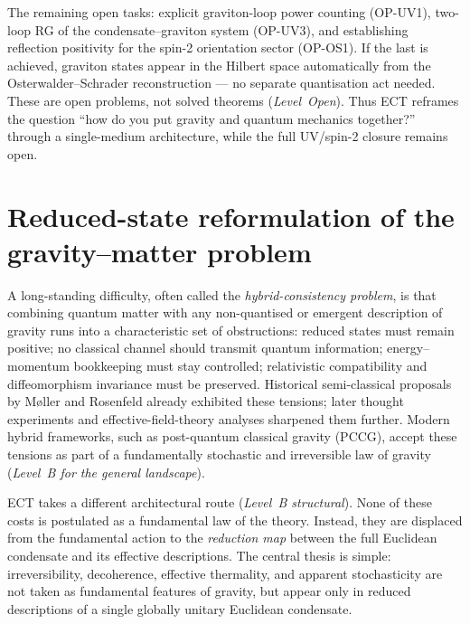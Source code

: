 \documentclass[11pt,a4paper]{article}
\begin{document}
The remaining open tasks: explicit graviton-loop power counting (OP-UV1), two-loop RG of the condensate--graviton system (OP-UV3), and establishing reflection positivity for the spin-2 orientation sector (OP-OS1). If the last is achieved, graviton states appear in the Hilbert space automatically from the Osterwalder--Schrader reconstruction --- no separate quantisation act needed. These are open problems, not solved theorems (\emph{Level~Open}). Thus ECT reframes the question ``how do you put gravity and quantum mechanics together?'' through a single-medium architecture, while the full UV/spin-2 closure remains open.


\section{Reduced-state reformulation of the gravity--matter problem}
\label{sec:pop_hybrid_consistency}

A long-standing difficulty, often called the \emph{hybrid-consistency problem},
is that combining quantum matter with any non-quantised or emergent
description of gravity runs into a characteristic set of obstructions:
reduced states must remain positive; no classical channel should
transmit quantum information; energy--momentum bookkeeping must stay
controlled; relativistic compatibility and diffeomorphism invariance
must be preserved. Historical semi-classical proposals by M{\o}ller
and Rosenfeld already exhibited these tensions; later thought
experiments and effective-field-theory analyses sharpened them further.
Modern hybrid frameworks, such as post-quantum classical gravity
(PCCG), accept these tensions as part of a fundamentally stochastic
and irreversible law of gravity (\emph{Level~B for the general
landscape}).

ECT takes a different architectural route (\emph{Level~B structural}).
None of these costs is postulated as a fundamental law of the theory.
Instead, they are displaced from the fundamental action to the
\emph{reduction map} between the full Euclidean condensate and its
effective descriptions. The central thesis is simple: irreversibility,
decoherence, effective thermality, and apparent stochasticity are not
taken as fundamental features of gravity, but appear only in reduced
descriptions of a single globally unitary Euclidean condensate.
\end{document}
